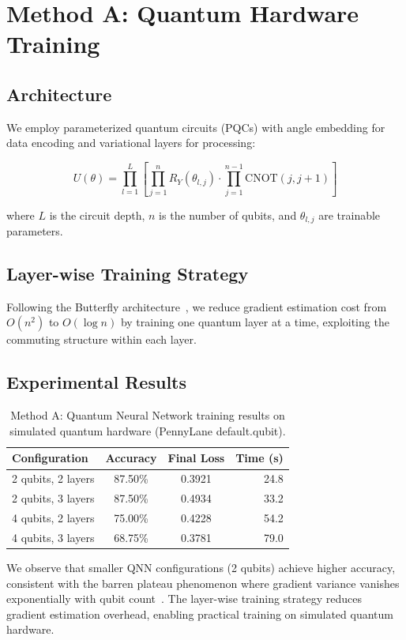 \documentclass[11pt,a4paper]{article}
\begin{document}
\section{Method A: Quantum Hardware Training}

\subsection{Architecture}
We employ parameterized quantum circuits (PQCs) with angle embedding for data encoding and variational layers for processing:

\begin{equation}
    U(\theta) = \prod_{l=1}^{L} \left[ \prod_{j=1}^{n} R_Y(\theta_{l,j}) \cdot \prod_{j=1}^{n-1} \text{CNOT}(j, j+1) \right]
\end{equation}

where $L$ is the circuit depth, $n$ is the number of qubits, and $\theta_{l,j}$ are trainable parameters.

\subsection{Layer-wise Training Strategy}
Following the Butterfly architecture~\cite{mathur2026}, we reduce gradient estimation cost from $O(n^2)$ to $O(\log n)$ by training one quantum layer at a time, exploiting the commuting structure within each layer.

\subsection{Experimental Results}
\begin{table}[h]
\centering
\caption{Method A: Quantum Neural Network training results on simulated quantum hardware (PennyLane default.qubit).}
\begin{tabular}{lccr}
\toprule
Configuration & Accuracy & Final Loss & Time (s) \\
\midrule
2 qubits, 2 layers & 87.50\% & 0.3921 & 24.8 \\
2 qubits, 3 layers & 87.50\% & 0.4934 & 33.2 \\
4 qubits, 2 layers & 75.00\% & 0.4228 & 54.2 \\
4 qubits, 3 layers & 68.75\% & 0.3781 & 79.0 \\
\bottomrule
\end{tabular}
\end{table}

We observe that smaller QNN configurations (2 qubits) achieve higher accuracy, consistent with the barren plateau phenomenon where gradient variance vanishes exponentially with qubit count~\cite{mcclean2018barren}. The layer-wise training strategy reduces gradient estimation overhead, enabling practical training on simulated quantum hardware.
\end{document}
